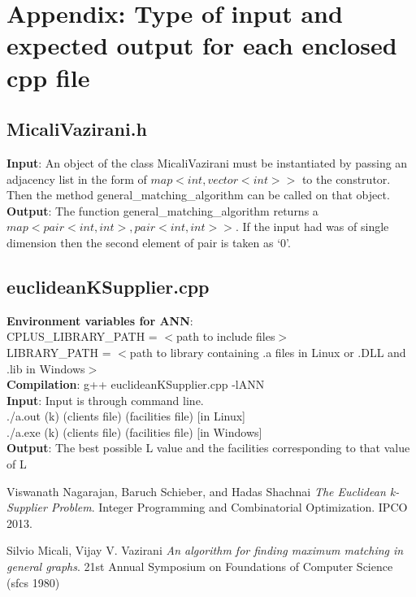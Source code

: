 \documentclass[12pt, a4paper]{article}
\begin{document}
{\section{Appendix: Type of input and expected output for each enclosed cpp file}
\subsection{MicaliVazirani.h}
\textbf{Input}: An object of the class MicaliVazirani must be instantiated by passing an adjacency list in the form of $map< int, vector<int>>$ to the construtor. Then the method general\_matching\_algorithm can be called on that object.\\

\textbf{Output}: The function general\_matching\_algorithm returns a $map<pair<int,int>,pair<int,int>>$. If the input had was of single dimension then the second element of pair is taken as `0'.

\subsection{euclideanKSupplier.cpp}
\textbf{Environment variables for ANN}: \\CPLUS\_LIBRARY\_PATH = $<$path to include files$>$\\
LIBRARY\_PATH = $<$path to library containing .a files in Linux or .DLL and .lib in Windows$>$\\

\textbf{Compilation}: g++ euclideanKSupplier.cpp -lANN\\

\textbf{Input}: Input is through command line.\\
./a.out (k) (clients file) (facilities file) [in Linux]\\
./a.exe (k) (clients file) (facilities file) [in Windows]\\

\textbf{Output}: The best possible L value and the facilities corresponding to that value of L\\

\begin{thebibliography}{5}
Viswanath Nagarajan, Baruch Schieber, and Hadas Shachnai
\textit{The Euclidean k-Supplier Problem}.
Integer Programming and Combinatorial Optimization. IPCO 2013.

 Silvio Micali, Vijay V. Vazirani
\textit{An algorithm for ﬁnding maximum matching in general graphs}.
21st Annual Symposium on Foundations of Computer Science (sfcs 1980)


\end{thebibliography}}
\end{document}
